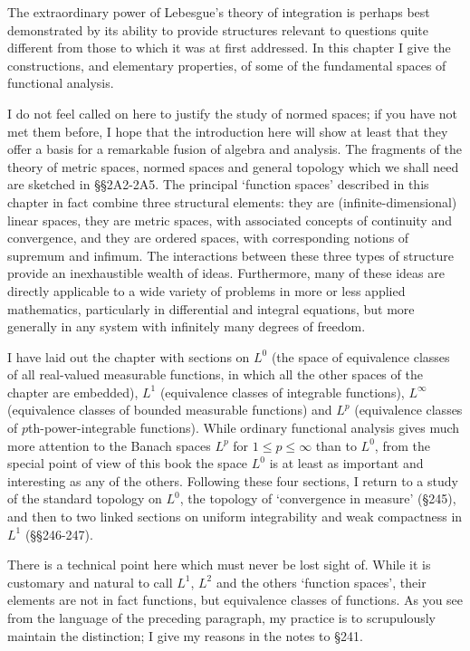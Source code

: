  
\def\chaptername{Function spaces} 
\def\sectionname{Introduction} 
 
 
The extraordinary power of Lebesgue's theory of integration is perhaps 
best demonstrated by its ability to provide structures relevant to 
questions quite different from those to which it was at first addressed. 
In this chapter I give the constructions, and elementary properties, of 
some of the fundamental spaces of functional analysis. 
 
I do not feel called on here to justify the study of normed spaces;  if 
you have not met them before, I hope that the introduction here will 
show at least that they offer a basis for a remarkable fusion of algebra 
and analysis.   The fragments of the theory of metric spaces, normed 
spaces and general topology which we shall need are sketched in 
\S\S2A2-2A5.  %
The principal `function spaces' described in this 
chapter in fact combine three structural elements:  they are 
(infinite-dimensional) linear spaces, they are metric spaces, with 
associated concepts of continuity and convergence, and they are ordered 
spaces, with corresponding notions of supremum and infimum.   The 
interactions between these three types of structure provide an 
inexhaustible wealth of ideas.   Furthermore, many of these ideas are 
directly applicable to a wide variety of problems in more or less 
applied mathematics, particularly in differential and integral 
equations, but more generally in any system with infinitely many degrees 
of freedom. 
 
I have laid out the chapter with sections on $L^0$ (the space of 
equivalence classes of all real-valued measurable functions, in which 
all the other spaces of the chapter are embedded), $L^1$ (equivalence 
classes of integrable functions), $L^{\infty}$ (equivalence classes of 
bounded measurable functions) and $L^p$ (equivalence classes of 
$p$th-power-integrable functions).   While ordinary functional analysis 
gives much more attention to the Banach spaces $L^p$ for  
$1\le p\le\infty$ than to $L^0$, from the special point of view of this book the space $L^0$ is at least as important and interesting as any of the others.   Following these four sections, I return to a study of the 
standard topology on $L^0$, the topology of `convergence in measure' 
(\S245), and then to two linked sections on uniform integrability and 
weak compactness in $L^1$ (\S\S246-247). 
 
There is a technical point here which must never be lost sight of. 
While it is customary and natural to call $L^1$, $L^2$ and the others 
`function spaces', their elements are not in fact functions, but 
equivalence classes of functions.   As you see from the language of the 
preceding paragraph, my practice is to scrupulously maintain the 
distinction;  I give my reasons in the notes to \S241. 
 
\discrpage 
 
